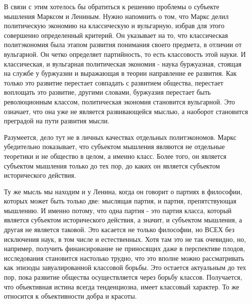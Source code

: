 \documentclass[../main]{subfiles}
\begin{document}
В связи с этим хотелось бы обратиться к решению проблемы о субъекте мышления Марксом и Лениным. Нужно напомнить о том, что Маркс делил политическую экономию на классическую и вульгарную, избрав для этого совершенно определенный критерий. Он указывает на то, что классическая политэкономия была этапом развития понимания своего предмета, в отличии от вульгарной. Он четко определяет партийность, то есть классовость этой науки. И классическая, и вульгарная политическая экономия - наука буржуазная, стоящая на службе у буржуазии и выражающая в теории направление ее развития. Как только это развитие перестает совпадать с развитием общества, перестает воплощать это развитие, другими словами, буржуазия перестает быть революционным классом, политическая экономия становится вульгарной. Это означает, что она уже не является развивающейся мыслью, а наоборот становится преградой на пути развития мысли.

Разумеется, дело тут не в личных качествах отдельных политэкономов. Маркс убедительно показывает, что субъектом мышления являются не отдельные теоретики и не общество в целом, а именно класс. Более того, он является субъектом мышления только до тех пор, до каких он является субъектом исторического действия.

Ту же мысль мы находим и у Ленина, когда он говорит о партиях в философии, которых может быть только две: мыслящая партия, и партия, препятствующая мышлению. И именно потому, что одна партия - это партия класса, который является субъектом исторического действия, а значит, и субъектом мышления, а другая не является таковой. Это касается не только философии, но ВСЕХ без исключения наук, в том числе и естественных. Хотя там это не так очевидно, но, например, получить финансирование не приносящих даже в перспективе плодов, исследования становится настолько трудно, что это вполне можно рассматривать как эпизоды завуалированной классовой борьбы. Это остается актуальным до тех пор, пока развитие общества осуществляется через борьбу классов. Получается, что объективная истина всегда тенденциозна, имеет классовый характер. То же относится к объективности добра и красоты.
\end{document}
